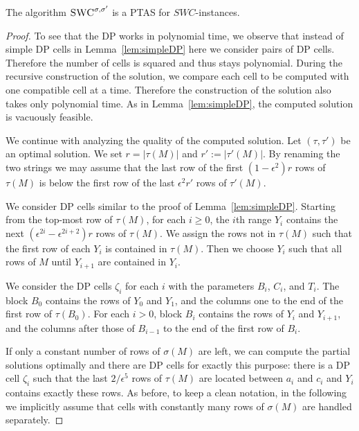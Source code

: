 \begin{theorem}\label{thm:column1}
    The algorithm $\textsc{SWC}^{\sigma,\sigma'}$ is a PTAS for $SWC$-instances.
\end{theorem}
\begin{proof}
    To see that the DP works in polynomial time, we observe that instead of simple DP cells in Lemma~\ref{lem:simpleDP} here we consider pairs of DP cells.
    Therefore the number of cells is squared and thus stays polynomial.
    During the recursive construction of the solution, we compare each cell to be computed with one compatible cell at a time.
    Therefore the construction of the solution also takes only polynomial time.
    As in Lemma~\ref{lem:simpleDP}, the computed solution is vacuously feasible.

    We continue with analyzing the quality of the computed solution.
    Let $(\tau,\tau')$ be an optimal solution.
    We set $r = |\tau(M)|$ and $r' := |\tau'(M)|$.
    By renaming the two strings we may assume that the last row of the first $(1-\epsilon^2) r$ rows of $\tau(M)$ is below the first row of the last $\epsilon^2 r'$ rows of $\tau'(M)$.

    We consider DP cells similar to the proof of Lemma~\ref{lem:simpleDP}.
    Starting from the top-most row of $\tau(M)$, for each $i \ge 0$, the $i$th range $Y_i$ contains the next 
    $(\epsilon^{2i} - \epsilon^{2i+2})r$ rows of $\tau(M)$.
    We assign the rows not in $\tau(M)$ such that the first row of each $Y_i$ is contained in $\tau(M)$.
    Then we choose $Y_i$ such that all rows of $M$ until $Y_{i+1}$ are contained in $Y_i$.

    We consider the DP cells $\zeta_i$ for each $i$ with the parameters $B_i$, $C_i$, and $T_i$.
    The block $B_0$ contains the rows of $Y_0$ and $Y_1$, and the columns one to the end of the first row of $\tau(B_0)$.
    For each $i > 0$, block $B_i$ contains the rows of $Y_i$ and $Y_{i+1}$, and the columns after those of $B_{i-1}$ to the end of the first row of $B_i$.

    If only a constant number of rows of $\sigma(M)$ are left, we can compute the partial solutions optimally and
    there are DP cells for exactly this purpose:
    there is a DP cell $\zeta_i$ such that the last $2/\epsilon^5$ rows of $\tau(M)$ are located between $a_i$ and $c_i$ and $Y_i$ contains exactly these rows.
    As before, to keep a clean notation, in the following we implicitly assume that cells with constantly many rows of $\sigma(M)$ are handled separately.


\end{proof}
